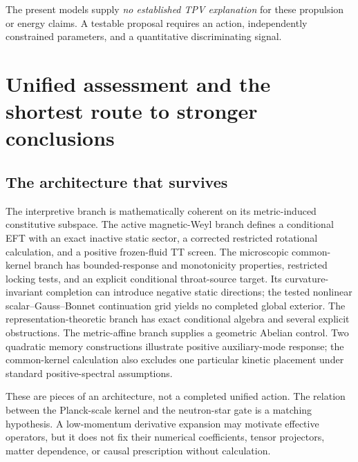 \documentclass[11pt,oneside]{report}
\begin{document}
The present models supply \emph{no established TPV explanation} for these propulsion or energy claims. A testable proposal requires an action, independently constrained parameters, and a quantitative discriminating signal.

\chapter{Unified assessment and the shortest route to stronger conclusions}
\section{The architecture that survives}
The interpretive branch is mathematically coherent on its metric-induced constitutive subspace. The active magnetic-Weyl branch defines a conditional EFT with an exact inactive static sector, a corrected restricted rotational calculation, and a positive frozen-fluid TT screen. The microscopic common-kernel branch has bounded-response and monotonicity properties, restricted locking tests, and an explicit conditional throat-source target. Its curvature-invariant completion can introduce negative static directions; the tested nonlinear scalar--Gauss--Bonnet continuation grid yields no completed global exterior. The representation-theoretic branch has exact conditional algebra and several explicit obstructions. The metric-affine branch supplies a geometric Abelian control. Two quadratic memory constructions illustrate positive auxiliary-mode response; the common-kernel calculation also excludes one particular kinetic placement under standard positive-spectral assumptions.

These are pieces of an architecture, not a completed unified action. The relation between the Planck-scale kernel and the neutron-star gate is a matching hypothesis. A low-momentum derivative expansion may motivate effective operators, but it does not fix their numerical coefficients, tensor projectors, matter dependence, or causal prescription without calculation.
\end{document}
